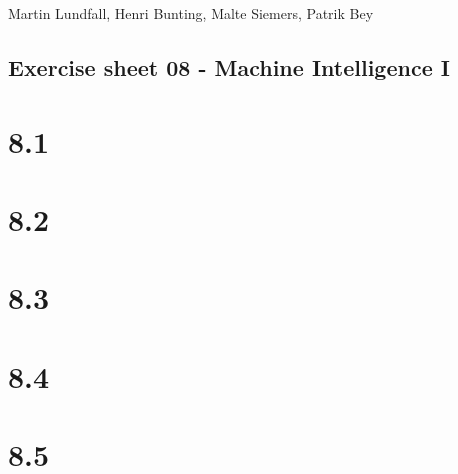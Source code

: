 \documentclass[11pt,a4paper]{article}
\begin{document}
\noindent
Martin Lundfall, Henri Bunting, Malte Siemers, Patrik Bey
\begin{centering}
  \section*{Exercise sheet 08 - Machine Intelligence I}
  \end{centering}
\section*{8.1}
\section*{8.2}
\section*{8.3}

\section*{8.4}
\section*{8.5}
\end{document}
